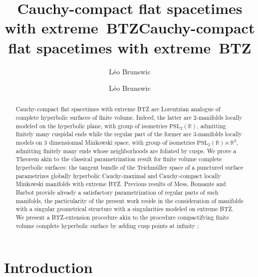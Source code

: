\documentclass[a4paper,12pt]{article}
\title{Cauchy-compact flat spacetimes with extreme~BTZ}
\author{L\'eo Brunswic}
\def\R{\mathbb{R}}
\def\RR{\mathbb{R}}
\begin{document}
\title{Cauchy-compact flat spacetimes with extreme~BTZ}


\author{L\'eo Brunswic}




\maketitle

\begin{abstract}

Cauchy-compact flat spacetimes with extreme BTZ are Lorentzian analogue of complete hyperbolic surfaces of finite volume. Indeed, the latter are 2-manifolds locally modeled on the hyperbolic plane, with group of isometries $\mathrm{PSL}_2(\R)$, admitting finitely many cuspidal ends while the regular part of the former are 3-manifolds locally models on 3 dimensionnal Minkowski 
space, with group of isometries 
$\mathrm{PSL}_2(\R)\ltimes \RR^3$,
admitting finitely many ends whose neighborhoods are foliated by cusps. We prove a Theorem akin to the classical parametrization result for finite volume complete hyperbolic surfaces: the tangent bundle of the Teichmüller space of a punctured surface parametrizes globally hyperbolic Cauchy-maximal and Cauchy-compact locally Minkowski manifolds with extreme BTZ. Previous results of Mess, Bonsante and Barbot provide already a satisfactory parametrization of regular parts of such manifolds, the particularity of the present work reside in the consideration of manifolds with a singular geometrical structure with a singularities modeled on extreme BTZ. 
We present a BTZ-extension procedure akin to the procedure compactifying finite volume complete hyperbolic surface by adding cusp points at infinity
;

\end{abstract}


\maketitle

\tableofcontents
\section{Introduction}
\end{document}
